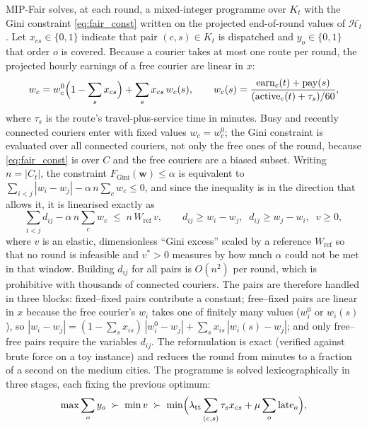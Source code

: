 \documentclass[preprint,12pt,authoryear]{elsarticle}%
\newcommand{\Hist}{\mathcal{H}}
\newcommand{\FG}{F_{\text{Gini}}}
\DeclareMathOperator{\earn}{earn}
\DeclareMathOperator{\act}{active}
\DeclareMathOperator{\pay}{pay}
\begin{document}
MIP-Fair solves, at each round, a mixed-integer programme over $K_t$ with the Gini constraint \eqref{eq:fair_const} written on the projected end-of-round values of $\Hist_t$. Let $x_{cs} \in \{0,1\}$ indicate that pair $(c,s) \in K_t$ is dispatched and $y_o \in \{0,1\}$ that order $o$ is covered. Because a courier takes at most one route per round, the projected hourly earnings of a free courier are linear in $x$:
\begin{equation}
w_c = w_c^0 \Bigl(1 - \sum_{s} x_{cs}\Bigr) + \sum_{s} x_{cs}\, w_c(s), \qquad
w_c(s) = \frac{\earn_c(t) + \pay(s)}{(\act_c(t) + \tau_s)/60},
\label{eq:mipfair_w}
\end{equation}
where $\tau_s$ is the route's travel-plus-service time in minutes. Busy and recently connected couriers enter with fixed values $w_c = w_c^0$; the Gini constraint is evaluated over all connected couriers, not only the free ones of the round, because \eqref{eq:fair_const} is over $C$ and the free couriers are a biased subset. Writing $n = |C_t|$, the constraint $\FG(\mathbf{w}) \le \alpha$ is equivalent to $\sum_{i<j} |w_i - w_j| - \alpha\, n \sum_c w_c \le 0$, and since the inequality is in the direction that allows it, it is linearised exactly as
\begin{equation}
\sum_{i<j} d_{ij} - \alpha\, n \sum_c w_c \;\le\; n\, W_{\text{ref}}\, v, \qquad
d_{ij} \ge w_i - w_j,\;\; d_{ij} \ge w_j - w_i,\;\; v \ge 0,
\label{eq:mipfair_gini}
\end{equation}
where $v$ is an elastic, dimensionless ``Gini excess'' scaled by a reference $W_{\text{ref}}$ so that no round is infeasible and $v^* > 0$ measures by how much $\alpha$ could not be met in that window. Building $d_{ij}$ for all pairs is $O(n^2)$ per round, which is prohibitive with thousands of connected couriers. The pairs are therefore handled in three blocks: fixed--fixed pairs contribute a constant; free--fixed pairs are linear in $x$ because the free courier's $w_i$ takes one of finitely many values ($w_i^0$ or $w_i(s)$), so $|w_i - w_j| = (1 - \sum_s x_{is})\,|w_i^0 - w_j| + \sum_s x_{is}\,|w_i(s) - w_j|$; and only free--free pairs require the variables $d_{ij}$. The reformulation is exact (verified against brute force on a toy instance) and reduces the round from minutes to a fraction of a second on the medium cities. The programme is solved lexicographically in three stages, each fixing the previous optimum:
\begin{equation}
\max \sum_o y_o \;\succ\; \min v \;\succ\; \min \Bigl(\lambda_{\text{tt}} \sum_{(c,s)} \tau_s x_{cs} + \mu \sum_o \text{late}_o\Bigr),
\label{eq:mipfair_lex}
\end{equation}
\end{document}
